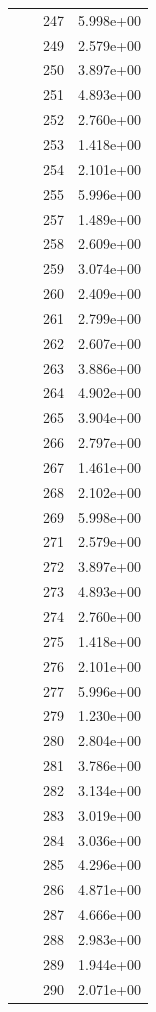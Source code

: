\documentclass[12pt]{article}
\begin{document}
\begin{longtable}{@{}cccc@{}}
 &  & 247 & 5.998e+00 \\
 &  & 249 & 2.579e+00 \\
 &  & 250 & 3.897e+00 \\
 &  & 251 & 4.893e+00 \\
 &  & 252 & 2.760e+00 \\
 &  & 253 & 1.418e+00 \\
 &  & 254 & 2.101e+00 \\
 &  & 255 & 5.996e+00 \\
 &  & 257 & 1.489e+00 \\
 &  & 258 & 2.609e+00 \\
 &  & 259 & 3.074e+00 \\
 &  & 260 & 2.409e+00 \\
 &  & 261 & 2.799e+00 \\
 &  & 262 & 2.607e+00 \\
 &  & 263 & 3.886e+00 \\
 &  & 264 & 4.902e+00 \\
 &  & 265 & 3.904e+00 \\
 &  & 266 & 2.797e+00 \\
 &  & 267 & 1.461e+00 \\
 &  & 268 & 2.102e+00 \\
 &  & 269 & 5.998e+00 \\
 &  & 271 & 2.579e+00 \\
 &  & 272 & 3.897e+00 \\
 &  & 273 & 4.893e+00 \\
 &  & 274 & 2.760e+00 \\
 &  & 275 & 1.418e+00 \\
 &  & 276 & 2.101e+00 \\
 &  & 277 & 5.996e+00 \\
 &  & 279 & 1.230e+00 \\
 &  & 280 & 2.804e+00 \\
 &  & 281 & 3.786e+00 \\
 &  & 282 & 3.134e+00 \\
 &  & 283 & 3.019e+00 \\
 &  & 284 & 3.036e+00 \\
 &  & 285 & 4.296e+00 \\
 &  & 286 & 4.871e+00 \\
 &  & 287 & 4.666e+00 \\
 &  & 288 & 2.983e+00 \\
 &  & 289 & 1.944e+00 \\
 &  & 290 & 2.071e+00 \\

\end{longtable}
\end{document}
